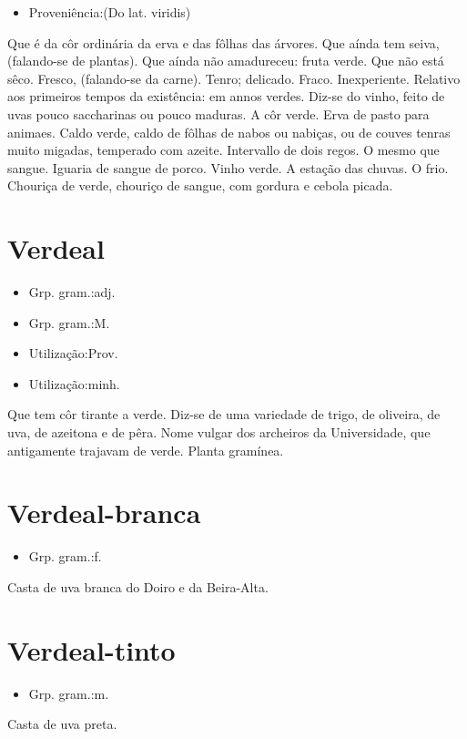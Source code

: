 \documentclass{article}
\begin{document}
\begin{itemize}
\item {Proveniência:(Do lat. \textunderscore viridis\textunderscore )}
\end{itemize}
Que é da côr ordinária da erva e das fôlhas das árvores.
Que aínda tem seiva, (falando-se de plantas).
Que aínda não amadureceu: \textunderscore fruta verde\textunderscore .
Que não está sêco.
Fresco, (falando-se da carne).
Tenro; delicado.
Fraco.
Inexperiente.
Relativo aos primeiros tempos da existência: \textunderscore em annos verdes\textunderscore .
Diz-se do vinho, feito de uvas pouco saccharinas ou pouco maduras.
A côr verde.
Erva de pasto para animaes.
\textunderscore Caldo verde\textunderscore , caldo de fôlhas de nabos ou nabiças, ou de couves tenras muito migadas, temperado com azeite.
Intervallo de dois regos.
O mesmo que \textunderscore sangue\textunderscore .
Iguaria de sangue de porco.
Vinho verde.
A estação das chuvas.
O frio.
\textunderscore Chouriça de verde\textunderscore , chouriço de sangue, com gordura e cebola picada.
\section{Verdeal}
\begin{itemize}
\item {Grp. gram.:adj.}
\end{itemize}
\begin{itemize}
\item {Grp. gram.:M.}
\end{itemize}
\begin{itemize}
\item {Utilização:Prov.}
\end{itemize}
\begin{itemize}
\item {Utilização:minh.}
\end{itemize}
Que tem côr tirante a verde.
Diz-se de uma variedade de trigo, de oliveira, de uva, de azeitona e de pêra.
Nome vulgar dos archeiros da Universidade, que antigamente trajavam de verde.
Planta gramínea.
\section{Verdeal-branca}
\begin{itemize}
\item {Grp. gram.:f.}
\end{itemize}
Casta de uva branca do Doiro e da Beira-Alta.
\section{Verdeal-tinto}
\begin{itemize}
\item {Grp. gram.:m.}
\end{itemize}
Casta de uva preta.
\end{document}
